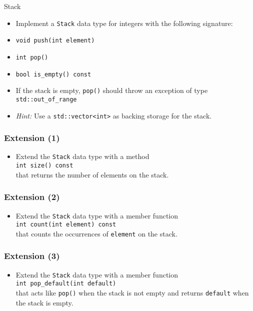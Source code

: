 \documentclass[10pt,aspectratio=169]{beamer}
\begin{document}
\begin{frame}[fragile]{Stack}
\begin{itemize}
\item Implement a \texttt{Stack} data type for integers with the
  following signature:
\item \texttt{void push(int element)}
\item \texttt{int pop()}
\item \verb!bool is_empty() const!
\item If the stack is empty, \texttt{pop()} should throw an exception
  of type \verb!std::out_of_range!
\item \textit{Hint: }Use a \verb!std::vector<int>! as backing storage for the
  stack.
\end{itemize}
\end{frame}

\begin{frame}[fragile]
  \frametitle{Extension (1)}  
  \begin{itemize}
  \item Extend the \texttt{Stack} data type with a method\\[1ex]
    \texttt{int size() const}\\[1ex]
    that returns the number of elements on the stack.
  \end{itemize}
\end{frame}

\begin{frame}[fragile]
  \frametitle{Extension (2)}  
  \begin{itemize}
  \item Extend the \texttt{Stack} data type with a member function\\[1ex]
    \texttt{int count(int element) const}\\[1ex]
    that counts the occurrences of \texttt{element} on the stack.
  \end{itemize}
\end{frame}

\begin{frame}[fragile]
  \frametitle{Extension (3)}  
  \begin{itemize}
  \item Extend the \texttt{Stack} data type with a member function\\[1ex]
    \verb!int pop_default(int default)!\\[1ex]
    that acts like \texttt{pop()} when the stack is not empty and
    returns \texttt{default} when the stack is empty.
  \end{itemize}
\end{frame}
\end{document}
